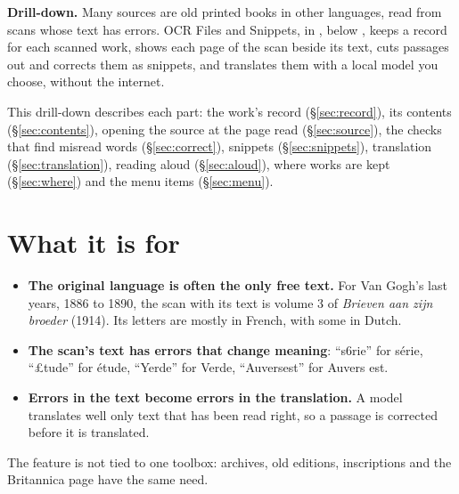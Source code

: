 \begin{nbox}
{\color{amber}\bfseries Drill-down.}\enspace
Many sources are old printed books in other languages, read from scans whose text has errors. OCR Files and Snippets,
in \gt{}, below , keeps a record for each scanned work, shows each page of the scan beside its text, cuts passages out
and corrects them as snippets, and translates them with a local model you choose, without the internet.

This drill-down describes each part: the work's record (\S\ref{sec:record}), its contents (\S\ref{sec:contents}),
opening the source at the page read (\S\ref{sec:source}), the checks that find misread words (\S\ref{sec:correct}), snippets (\S\ref{sec:snippets}), translation
(\S\ref{sec:translation}), reading aloud (\S\ref{sec:aloud}), where works are kept (\S\ref{sec:where}) and the menu
items (\S\ref{sec:menu}).
\end{nbox}

\tableofcontents

\section{What it is for}\label{sec:why}
\begin{itemize}
  \item \textbf{The original language is often the only free text.} For Van Gogh's last years, 1886 to 1890, the scan
    with its text is volume 3 of \emph{Brieven aan zijn broeder} (1914). Its letters are mostly in French, with some
    in Dutch.
  \item \textbf{The scan's text has errors that change meaning}: ``s6rie'' for s\'erie, ``\pounds tude'' for
    \'etude, ``Yerde'' for Verde, ``Auversest'' for Auvers est.
  \item \textbf{Errors in the text become errors in the translation.} A model translates well only text that has been
    read right, so a passage is corrected before it is translated.
\end{itemize}
The feature is not tied to one toolbox: archives, old editions, inscriptions and the Britannica page have the same
need.

